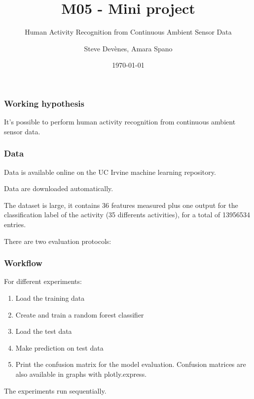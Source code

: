 \documentclass{beamer}
\title{M05 - Mini project}
\subtitle{Human Activity Recognition from Continuous Ambient Sensor Data}
\author{Steve Devènes, Amara Spano}
\institute{Unidistance}
\date{\today}
\begin{document}
	\begin{frame}
		\titlepage
	\end{frame}



	\begin{frame}
		\frametitle{Working hypothesis}
		It's possible to perform human activity recognition from continuous ambient sensor data.
	\end{frame}

	\begin{frame}
		\frametitle{Data}
		Data is available online on the UC Irvine machine learning repository.

		Data are downloaded automatically.

		The dataset is large, it contains 36 features measured plus one output for the classification label
		of the activity (35 differents activities), for a total of 13956534 entries.

		There are two evaluation protocols:
		\begin{figure}
			\centering
		\end{figure}
	\end{frame}

	\begin{frame}
		\frametitle{Workflow}
		For different experiments:
		\begin{enumerate}
			\item Load the training data
			\item Create and train a random forest classifier
			\item Load the test data
			\item Make prediction on test data
			\item Print the confusion matrix for the model evaluation. Confusion matrices are also available in graphs with plotly.express.
		\end{enumerate}

		The experiments run sequentially.
	\end{frame}
\end{document}
